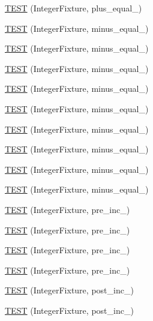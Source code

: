 \begin{DoxyCompactItemize}
\hyperlink{TestInteger_8c_09_09_a616b70f2803f734821c5581d153579f0}{T\-E\-S\-T} (Integer\-Fixture, plus\-\_\-equal\-\_)
\item 
\hyperlink{TestInteger_8c_09_09_a0780a4c4707bd1275ef2bc7c876fe6bd}{T\-E\-S\-T} (Integer\-Fixture, minus\-\_\-equal\-\_)
\item 
\hyperlink{TestInteger_8c_09_09_a38c0448a4f61256adff0d0c754e42a24}{T\-E\-S\-T} (Integer\-Fixture, minus\-\_\-equal\-\_)
\item 
\hyperlink{TestInteger_8c_09_09_a6c1b0d272ff4239a87c4460f3d2489c0}{T\-E\-S\-T} (Integer\-Fixture, minus\-\_\-equal\-\_)
\item 
\hyperlink{TestInteger_8c_09_09_a7ce8918ede377bfddb61c0a6e94b0d52}{T\-E\-S\-T} (Integer\-Fixture, minus\-\_\-equal\-\_)
\item 
\hyperlink{TestInteger_8c_09_09_a6e70b12e6b6c6eada50f762916c5be58}{T\-E\-S\-T} (Integer\-Fixture, minus\-\_\-equal\-\_)
\item 
\hyperlink{TestInteger_8c_09_09_a09f8698a4723d79ae74616695152235f}{T\-E\-S\-T} (Integer\-Fixture, minus\-\_\-equal\-\_)
\item 
\hyperlink{TestInteger_8c_09_09_a0a2e323ecb11808bc1fde12e41e7004e}{T\-E\-S\-T} (Integer\-Fixture, minus\-\_\-equal\-\_)
\item 
\hyperlink{TestInteger_8c_09_09_a5a2645cb3443ff13c1bb66b645f6df2d}{T\-E\-S\-T} (Integer\-Fixture, minus\-\_\-equal\-\_)
\item 
\hyperlink{TestInteger_8c_09_09_ae9601b31869a2b960c1c67d778d50ed2}{T\-E\-S\-T} (Integer\-Fixture, minus\-\_\-equal\-\_)
\item 
\hyperlink{TestInteger_8c_09_09_af1bc9d147c5aa39c46ffa73f2cdcd04c}{T\-E\-S\-T} (Integer\-Fixture, pre\-\_\-inc\-\_)
\item 
\hyperlink{TestInteger_8c_09_09_a9af7257e1657d70b4e02569fca91ef2d}{T\-E\-S\-T} (Integer\-Fixture, pre\-\_\-inc\-\_)
\item 
\hyperlink{TestInteger_8c_09_09_a188a220b2cd9239ef27d3274af69268c}{T\-E\-S\-T} (Integer\-Fixture, pre\-\_\-inc\-\_)
\item 
\hyperlink{TestInteger_8c_09_09_a9ad80ad58724f9cbff1b777336513d5e}{T\-E\-S\-T} (Integer\-Fixture, pre\-\_\-inc\-\_)
\item 
\hyperlink{TestInteger_8c_09_09_aef0dfdec9487fbf01c040aaa4e4bbd5b}{T\-E\-S\-T} (Integer\-Fixture, post\-\_\-inc\-\_)
\item 
\hyperlink{TestInteger_8c_09_09_aff9e0e59216934e893fdbbf8cd158ba3}{T\-E\-S\-T} (Integer\-Fixture, post\-\_\-inc\-\_)

\end{DoxyCompactItemize}
